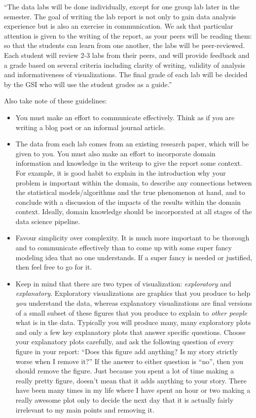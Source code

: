 \documentclass[letterpaper,12pt]{article}
\begin{document}
``The data labs will be done individually, except for one
group lab later in the semester. The goal of writing the lab report is not only to gain data analysis
experience but is also an exercise in communication. We ask that particular attention is given to
the writing of the report, as your peers will be reading them: so that the students can learn from
one another, the labs will be peer-reviewed. Each student will review 2-3 labs from their peers, and
will provide feedback and a grade based on several criteria including clarity of writing, validity of
analysis and informativeness of visualizations. The final grade of each lab will be decided by the
GSI who will use the student grades as a guide.''

Also take note of these guidelines:
\begin{itemize}
    \item You must make an effort to communicate effectively. Think as if you are writing a blog post or an informal journal article.
    \item The data from each lab comes from an existing research paper, which will be given to you. You must also make an effort to incorporate domain information and knowledge in the writeup to give the report some context. For example, it is good habit to explain in the introduction why your problem is important within the domain, to describe any connections between the statistical models/algorithms and the true phenomenon at hand, and to conclude with a discussion of the impacts of the results within the domain context. Ideally, domain knowledge should be incorporated at all stages of the data science pipeline.
    \item Favour simplicity over complexity. It is much more important to be thorough and to communicate effectively than to come up with some super fancy modeling idea that no one understands. If a super fancy is needed or justified, then feel free to go for it.
    \item Keep in mind that there are two types of visualization: \textit{exploratory} and \textit{explanatory}. Exploratory visualizations are graphics that you produce to help \textit{you} understand the data, whereas explanatory visualizations are final versions of a small subset of these figures that you produce to explain to \textit{other people} what is in the data. Typically you will produce many, many exploratory plots and only a few key explanatory plots that answer specific questions. Choose your explanatory plots carefully, and ask the following question of every figure in your report: ``Does this figure add anything? Is my story strictly worse when I remove it?'' If the answer to either question is ``no'', then you should remove the figure. Just because you spent a lot of time making a really pretty figure, doesn't mean that it adds anything to your story. There have been many times in my life where I have spent an hour or two making a really awesome plot only to decide the next day that it is actually fairly irrelevant to my main points and removing it.
\end{itemize}
\end{document}
